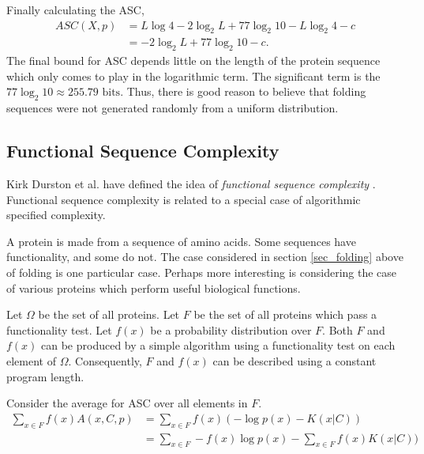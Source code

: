Finally calculating the ASC,
\begin{align}
    ASC(X,p) &= L \log 4 - 2 \log_2 L + 77 \log_2 10 - L \log_2 4 - c \nonumber \\
    &= - 2 \log_2 L + 77 \log_2 10 - c \mbox{.}
\end{align}
The final bound for ASC depends little on the length of the protein sequence which only comes to play in the logarithmic term.
The significant term is the $77 \log_2 10 \approx 255.79 \mbox{ bits}$.
Thus, there is good reason to believe that folding sequences were not generated randomly from a uniform distribution.

\subsection{Functional Sequence Complexity}
Kirk Durston et al. have defined the idea of {\it functional sequence complexity} .
Functional sequence complexity is related to a special case of algorithmic specified complexity.

A protein is made from a sequence of amino acids.
Some sequences have functionality, and some do not.
The case considered in section \ref{sec_folding} above of folding is one particular case.
Perhaps more interesting is considering the case of various proteins which perform useful biological functions.

Let $\Omega$ be the set of all proteins.
Let $F$ be the set of all proteins which pass a functionality test.
Let $f(x)$ be a probability distribution over $F$.
Both $F$ and $f(x)$ can be produced by a simple algorithm using a functionality test on each element of $\Omega$.
Consequently, $F$ and $f(x)$ can be described using a constant program length.

Consider the average for ASC over all elements in $F$.
\begin{align}
    \label{ASC.FSC.1}
    \sum_{x \in F} f(x) A(x,C,p) 
    &= \sum_{x \in F} f(x) (-\log p(x) - K(x|C))  \nonumber \\
    &= \sum_{x \in F} -f(x)\log p(x) - \sum_{x \in F} f(x) K(x|C))
\end{align}

